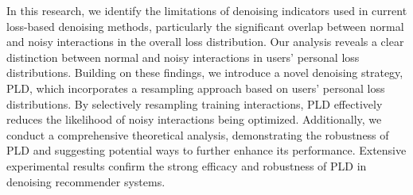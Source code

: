 In this research, we identify the limitations of denoising indicators used in current loss-based denoising methods, particularly the significant overlap between normal and noisy interactions in the overall loss distribution. Our analysis reveals a clear distinction between normal and noisy interactions in users' personal loss distributions. Building on these findings, we introduce a novel denoising strategy, PLD, which incorporates a resampling approach based on users' personal loss distributions. By selectively resampling training interactions, PLD effectively reduces the likelihood of noisy interactions being optimized. Additionally, we conduct a comprehensive theoretical analysis, demonstrating the robustness of PLD and suggesting potential ways to further enhance its performance. Extensive experimental results confirm the strong efficacy and robustness of PLD in denoising recommender systems.



